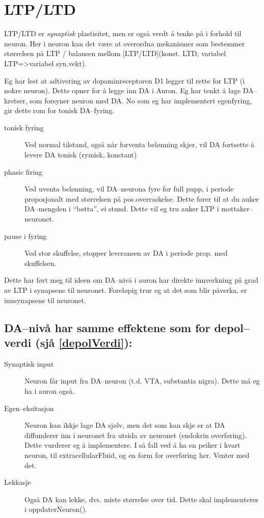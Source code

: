 \section{LTP/LTD}
LTP/LTD er \emph{synaptisk} plastisitet, men er også verdt å tenke på i forhold til neuron. Her i neuron kan det være at overordna mekanismer som bestemmer størrelsen på LTP / balansen mellom [LTP/LTD](konst. LTD, variabel LTP=>variabel syn.vekt).

Eg har lest at adtivering av dopaminreceptoren D1 legger til rette for LTP (i nokre neuron). Dette opner for å legge inn DA i Auron. 
Eg har tenkt å lage DA--kretser, som forsyner neuron med DA. No som eg har implementert egenfyring, gir dette rom for tonisk DA--fyring.
\begin{description}
	\item[tonisk fyring] Ved normal tilstand, også når forventa belønning skjer, vil DA fortsette å levere DA tonisk (rymisk, konstant)
	\item[phasic firing] Ved uventa belønning, vil DA--neurona fyre for full pupp, i periode proposjonalt med størrelsen på pos.overraskelse. Dette fører til at du auker DA--mengden i ``bøtta'', ei stund. Dette vil eg tru auker LTP i mottaker--neuronet.
	\item[pause i fyring] Ved stor skuffelse, stopper leveransen av DA i periode prop. med skuffelsen.
\end{description}

Dette har ført meg til ideen om DA--nivå i auron har direkte innverkning på grad av LTP i synapsene til neuronet. Foreløpig trur eg at det som blir påverka, er innsynapsene til neuronet.

\subsection{DA--nivå har samme effektene som for depol--verdi (sjå \ref{depolVerdi}):}
\begin{description}
	\item[Synaptisk input] Neuron får input fra DA--neuron (t.d. VTA, substantia nigra). Dette må eg ha i auron også.
	\item[Egen--eksitasjon] Neuron kan ikkje lage DA sjølv, men det som kan skje er at DA diffunderer inn i neuronet fra utsida av neuronet (endokrin overføring). Dette vurderer eg å implementere. I så fall ved å ha en peiker i kvart neuron, til extracellularFluid, og en form for overføring her. Venter med det.
	\item[Lekkasje] Også DA kan lekke, dvs. miste størrelse over tid. Dette skal implementeres i oppdaterNeuron().
\end{description}



